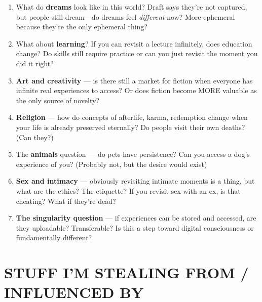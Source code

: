 \documentclass[11pt,letterpaper]{article}
\begin{document}
\begin{enumerate}[leftmargin=*]
    \item What do \textbf{dreams} look like in this world? Draft says they're not captured, but people still dream---do dreams feel \textit{different} now? More ephemeral because they're the only ephemeral thing?
    
    \item What about \textbf{learning}? If you can revisit a lecture infinitely, does education change? Do skills still require practice or can you just revisit the moment you did it right?
    
    \item \textbf{Art and creativity} --- is there still a market for fiction when everyone has infinite real experiences to access? Or does fiction become MORE valuable as the only source of novelty?
    
    \item \textbf{Religion} --- how do concepts of afterlife, karma, redemption change when your life is already preserved eternally? Do people visit their own deaths? (Can they?)
    
    \item The \textbf{animals} question --- do pets have persistence? Can you access a dog's experience of you? (Probably not, but the desire would exist)
    
    \item \textbf{Sex and intimacy} --- obviously revisiting intimate moments is a thing, but what are the ethics? The etiquette? If you revisit sex with an ex, is that cheating? What if they're dead?
    
    \item \textbf{The singularity question} --- if experiences can be stored and accessed, are they uploadable? Transferable? Is this a step toward digital consciousness or fundamentally different?
\end{enumerate}

\vspace{1em}

\section*{STUFF I'M STEALING FROM / INFLUENCED BY}
\end{document}
